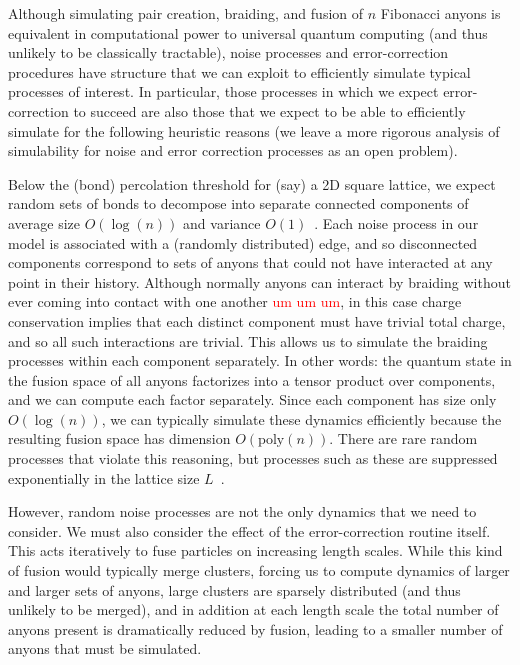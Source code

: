 \documentclass[aps, prl, letterpaper, twocolumn, superscriptaddress, notitlepage, 10pt]{revtex4-1}
\newcommand{\dude}[1]{\textcolor{red}{#1}}
\begin{document}
Although simulating pair creation, braiding, and fusion of $n$ Fibonacci anyons is equivalent 
in computational power to universal quantum computing (and thus unlikely to be classically 
tractable), noise processes and error-correction procedures have structure that we can 
exploit to efficiently simulate typical processes of interest. In particular, those 
processes in which we expect error-correction to succeed are also those that we expect to 
be able to efficiently simulate for the following heuristic reasons (we leave a more rigorous analysis of simulability for noise and error correction processes as an open problem).

Below the (bond) percolation threshold for (say) a 2D square lattice, we expect random sets of 
bonds to decompose into separate connected components 
of average size $O(\log(n))$ and variance $O(1)$~\cite{Bazant2000}.
Each noise process in our model is associated with a (randomly distributed) edge, and so 
disconnected components correspond to sets of anyons that could not have interacted at any 
point in their history. 
Although normally anyons can interact by braiding without ever coming 
into contact with one another \dude{um um um}, in this case charge conservation 
implies that each distinct component must have trivial total charge, and so all such interactions are trivial.
This allows us to simulate the braiding processes within each component 
separately. In other words: the quantum state in the fusion space of all anyons factorizes into 
a tensor product over components, and we can compute each factor separately. Since each 
component has size only $O(\log(n))$, we can typically simulate these dynamics efficiently 
because the resulting fusion space has dimension $O(\mathrm{poly}(n))$. There are rare 
random processes that violate this reasoning, but processes such as these are suppressed 
exponentially in the lattice size $L$~\cite{Grimmett1989}. 

However, random noise processes are not the only dynamics that we need to consider. We 
must also consider the effect of the error-correction routine itself. This acts iteratively to fuse 
particles on increasing length scales. While this kind of fusion would typically merge clusters, 
forcing us to compute dynamics of larger and larger sets of anyons, large clusters are sparsely distributed 
(and thus unlikely to be merged), and in addition at each length scale the total number of 
anyons present is dramatically reduced by fusion, leading to a smaller number of anyons that 
must be simulated.
\end{document}
